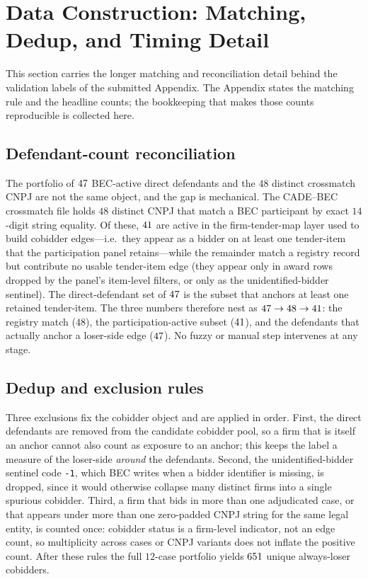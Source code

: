 \section{Data Construction: Matching, Dedup, and Timing Detail}
\label{supp:data_detail}

This section carries the longer matching and reconciliation detail
behind the validation labels of the submitted Appendix. The Appendix
states the matching rule and the headline counts; the bookkeeping that
makes those counts reproducible is collected here.

\subsection{Defendant-count reconciliation}

The portfolio of $47$ BEC-active direct defendants and the
$48$ distinct crossmatch CNPJ are not the same object, and the gap is
mechanical. The CADE--BEC crossmatch file holds $48$ distinct CNPJ that
match a BEC participant by exact $14$-digit string equality. Of these,
$41$ are active in the firm-tender-map layer used
to build cobidder edges---i.e.\ they appear as a bidder on at least one
tender-item that the participation panel retains---while the remainder
match a registry record but contribute no usable tender-item edge (they
appear only in award rows dropped by the panel's item-level filters, or
only as the unidentified-bidder sentinel). The direct-defendant set of
$47$ is the subset that anchors at least one retained
tender-item. The three numbers therefore nest as
$47\to48\to41$: the registry match
($48$), the participation-active subset
($41$), and the defendants that actually anchor a
loser-side edge ($47$). No fuzzy or manual step intervenes
at any stage.

\subsection{Dedup and exclusion rules}

Three exclusions fix the cobidder object and are applied in order.
First, the direct defendants are removed from the candidate cobidder
pool, so a firm that is itself an anchor cannot also count as exposure
to an anchor; this keeps the label a measure of the loser-side
\emph{around} the defendants. Second, the unidentified-bidder sentinel
code \texttt{-1}, which BEC writes when a bidder identifier is missing,
is dropped, since it would otherwise collapse many distinct firms into a
single spurious cobidder. Third, a firm that bids in more than one
adjudicated case, or that appears under more than one zero-padded CNPJ
string for the same legal entity, is counted once: cobidder status is a
firm-level indicator, not an edge count, so multiplicity across cases or
CNPJ variants does not inflate the positive count. After these rules the
full $12$-case portfolio yields $651$ unique always-loser
cobidders.

